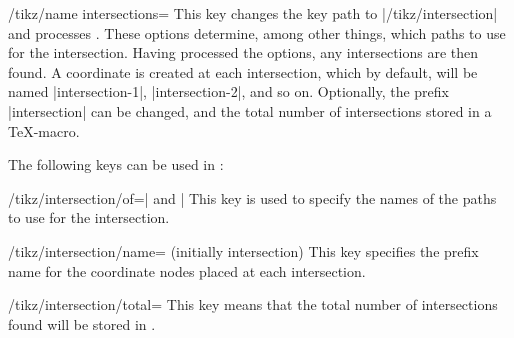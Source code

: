 \begin{key}{/tikz/name intersections=}
    This key changes the key path to |/tikz/intersection| and processes
    . These options determine, among other things, which paths to
    use for the intersection. Having processed the options, any intersections
    are then found. A coordinate is created at each intersection, which by
    default, will be named |intersection-1|, |intersection-2|, and so on.
    Optionally, the prefix |intersection| can be changed, and the total number
    of intersections stored in a \TeX-macro.
\begin{codeexample}[preamble={\usetikzlibrary{intersections}}]
\end{codeexample}

    The following keys can be used in :

    \begin{key}{/tikz/intersection/of=| and |}
        This key is used to specify the names of the paths to use for the
        intersection.
    \end{key}

    \begin{key}{/tikz/intersection/name= (initially intersection)}
        This key specifies the prefix name for the coordinate nodes placed at
        each intersection.
    \end{key}

    \begin{key}{/tikz/intersection/total=}
        This key means that the total number of intersections found will be
        stored in .
    \end{key}

\begin{codeexample}[preamble={\usetikzlibrary{intersections}}]
\end{codeexample}
\end{key}
